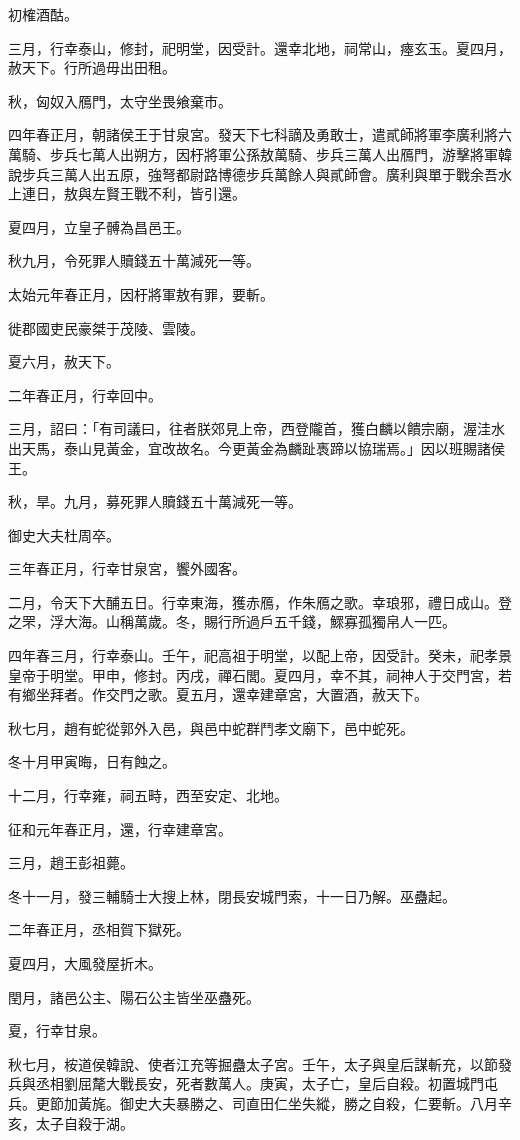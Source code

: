 \begin{pinyinscope}
初榷酒酤。

三月，行幸泰山，修封，祀明堂，因受計。還幸北地，祠常山，瘞玄玉。夏四月，赦天下。行所過毋出田租。

秋，匈奴入鴈門，太守坐畏飨棄市。

四年春正月，朝諸侯王于甘泉宮。發天下七科謫及勇敢士，遣貳師將軍李廣利將六萬騎、步兵七萬人出朔方，因杅將軍公孫敖萬騎、步兵三萬人出鴈門，游擊將軍韓說步兵三萬人出五原，強弩都尉路博德步兵萬餘人與貳師會。廣利與單于戰余吾水上連日，敖與左賢王戰不利，皆引還。

夏四月，立皇子髆為昌邑王。

秋九月，令死罪人贖錢五十萬減死一等。

太始元年春正月，因杅將軍敖有罪，要斬。

徙郡國吏民豪桀于茂陵、雲陵。

夏六月，赦天下。

二年春正月，行幸回中。

三月，詔曰：「有司議曰，往者朕郊見上帝，西登隴首，獲白麟以饋宗廟，渥洼水出天馬，泰山見黃金，宜改故名。今更黃金為麟趾褭蹄以協瑞焉。」因以班賜諸侯王。

秋，旱。九月，募死罪人贖錢五十萬減死一等。

御史大夫杜周卒。

三年春正月，行幸甘泉宮，饗外國客。

二月，令天下大酺五日。行幸東海，獲赤鴈，作朱鴈之歌。幸琅邪，禮日成山。登之罘，浮大海。山稱萬歲。冬，賜行所過戶五千錢，鰥寡孤獨帛人一匹。

四年春三月，行幸泰山。壬午，祀高祖于明堂，以配上帝，因受計。癸未，祀孝景皇帝于明堂。甲申，修封。丙戌，禪石閭。夏四月，幸不其，祠神人于交門宮，若有鄉坐拜者。作交門之歌。夏五月，還幸建章宮，大置酒，赦天下。

秋七月，趙有蛇從郭外入邑，與邑中蛇群鬥孝文廟下，邑中蛇死。

冬十月甲寅晦，日有蝕之。

十二月，行幸雍，祠五畤，西至安定、北地。

征和元年春正月，還，行幸建章宮。

三月，趙王彭祖薨。

冬十一月，發三輔騎士大搜上林，閉長安城門索，十一日乃解。巫蠱起。

二年春正月，丞相賀下獄死。

夏四月，大風發屋折木。

閏月，諸邑公主、陽石公主皆坐巫蠱死。

夏，行幸甘泉。

秋七月，桉道侯韓說、使者江充等掘蠱太子宮。壬午，太子與皇后謀斬充，以節發兵與丞相劉屈氂大戰長安，死者數萬人。庚寅，太子亡，皇后自殺。初置城門屯兵。更節加黃旄。御史大夫暴勝之、司直田仁坐失縱，勝之自殺，仁要斬。八月辛亥，太子自殺于湖。


\end{pinyinscope}
